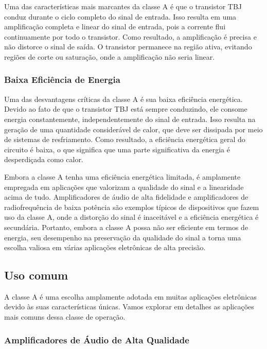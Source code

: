 Uma das características mais marcantes da classe A é que o transistor TBJ conduz durante o ciclo completo do sinal de entrada. Isso resulta em uma amplificação completa e linear do sinal de entrada, pois a corrente flui continuamente por todo o transistor. Como resultado, a amplificação é precisa e não distorce o sinal de saída. O transistor permanece na região ativa, evitando regiões de corte ou saturação, onde a amplificação não seria linear.

\subsubsection{Baixa Eficiência de Energia}

Uma das desvantagens críticas da classe A é sua baixa eficiência energética. Devido ao fato de que o transistor TBJ está sempre conduzindo, ele consome energia constantemente, independentemente do sinal de entrada. Isso resulta na geração de uma quantidade considerável de calor, que deve ser dissipada por meio de sistemas de resfriamento. Como resultado, a eficiência energética geral do circuito é baixa, o que significa que uma parte significativa da energia é desperdiçada como calor.

Embora a classe A tenha uma eficiência energética limitada, é amplamente empregada em aplicações que valorizam a qualidade do sinal e a linearidade acima de tudo. Amplificadores de áudio de alta fidelidade e amplificadores de radiofrequência de baixa potência são exemplos típicos de dispositivos que fazem uso da classe A, onde a distorção do sinal é inaceitável e a eficiência energética é secundária. Portanto, embora a classe A possa não ser eficiente em termos de energia, seu desempenho na preservação da qualidade do sinal a torna uma escolha valiosa em várias aplicações eletrônicas de alta precisão.

\subsection{Uso comum}

A classe A é uma escolha amplamente adotada em muitas aplicações eletrônicas devido às suas características únicas. Vamos explorar em detalhes as aplicações mais comuns dessa classe de operação.

\subsubsection{Amplificadores de Áudio de Alta Qualidade}

